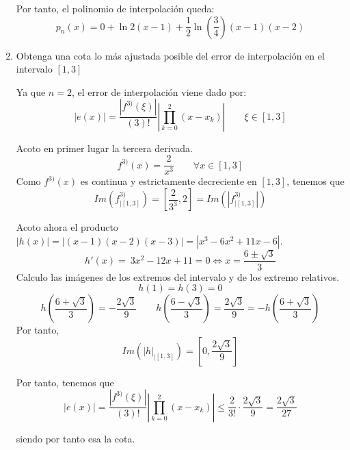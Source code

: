 \begin{ejercicio}
\begin{enumerate}
        Por tanto, el polinomio de interpolación queda:
        \begin{equation*}
            p_n (x) = 0 + \ln 2 (x-1) +\frac{1}{2} \ln \left(\frac{3}{4} \right) (x-1)(x-2)
        \end{equation*}

        \item Obtenga una cota lo más ajustada posible del error de interpolación en el intervalo $[1, 3]$

        Ya que $n=2$, el error de interpolación viene dado por:
        \begin{equation*}
            |e(x)| = \frac{|f^{3)}(\xi)|}{(3)!}\left|\prod_{k=0}^2 (x-x_k)\right| \qquad \xi \in [1,3]
        \end{equation*}

        Acoto en primer lugar la tercera derivada.
        \begin{equation*}
            f^{3)}(x) = \frac{2}{x^3} \qquad \forall x\in [1,3]
        \end{equation*}
        Como $f^{3)}(x)$ es continua y estrictamente decreciente en $[1,3]$, tenemos que
        \begin{equation*}
            Im(f^{3)}_{\left|[1,3]\right.}) = \left[\frac{2}{3^3}, 2\right] =  Im(|f^{3)}_{\left|[1,3]\right.}|)
        \end{equation*}

        Acoto ahora el producto $|h(x)| = |(x-1)(x-2)(x-3)| = |x^3-6x^2+11x-6|$.
        \begin{equation*}
            h'(x)=~3x^2-12x+11 = 0 \Longleftrightarrow x = \frac{6\pm \sqrt{3}}{3}
        \end{equation*}
        Calculo las imágenes de los extremos del intervalo y de los extremo relativos.
        \begin{equation*}
            h(1)=h(3) = 0
        \end{equation*}
        \begin{equation*}
            h\left(\frac{6+ \sqrt{3}}{3} \right) = -\frac{2\sqrt{3}}{9}
            \qquad
            h\left(\frac{6- \sqrt{3}}{3} \right) = \frac{2\sqrt{3}}{9} = -h\left(\frac{6+ \sqrt{3}}{3} \right)
        \end{equation*}
        Por tanto,
        \begin{equation*}
            Im(|h|_{\left|[1,3]\right.}) = \left[0,\frac{2\sqrt{3}}{9}\right]
        \end{equation*}

        Por tanto, tenemos que
        \begin{equation*}
            |e(x)| = \frac{|f^{3)}(\xi)|}{(3)!}\left|\prod_{k=0}^2 (x-x_k)\right|
            \leq
            \frac{2}{3!} \cdot \frac{2\sqrt{3}}{9} = \frac{2\sqrt{3}}{27}
        \end{equation*}

        siendo por tanto esa la cota.
    \end{enumerate}
\end{ejercicio}

